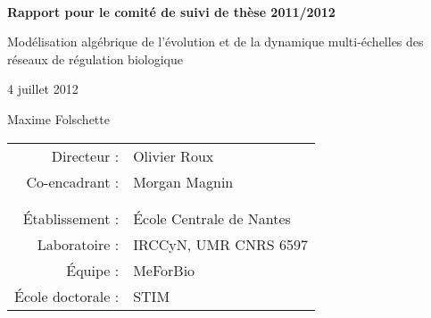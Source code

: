 
\thispagestyle{empty}

~
\vfill
{\Huge
\begin{center}
\textbf{Rapport pour le comité de suivi de thèse 2011/2012}

\vspace{1cm}

\LARGE
Modélisation algébrique de l'évolution et de la dynamique multi-échelles des réseaux de régulation biologique

\vspace{2cm}

\normalsize
4 juillet 2012

\vspace{1cm}

\Large
Maxime Folschette

\vspace{2cm}

\normalsize
\begin{tabular}{rl}
  Directeur :&Olivier Roux\\
  Co-encadrant :&Morgan Magnin\\
  &\\
  &\\
  Établissement :&École Centrale de Nantes\\
  Laboratoire :&IRCCyN, UMR CNRS 6597\\
  Équipe :&MeForBio\\
  École doctorale :&STIM
\end{tabular}

\end{center}

\vspace{2cm}
}
